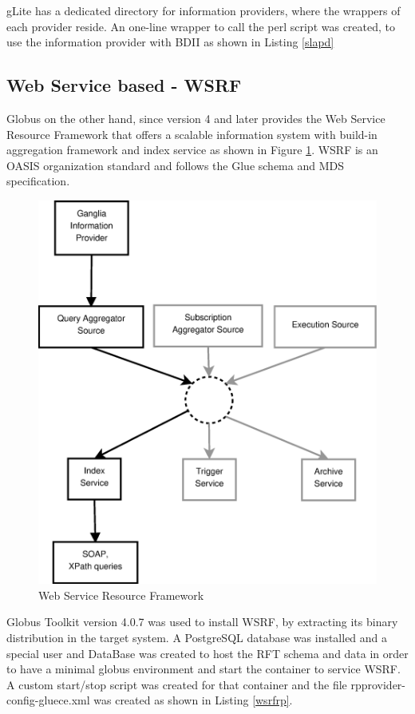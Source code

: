 gLite has a dedicated directory for information providers, where the wrappers of each provider reside. An one-line wrapper to call the perl script was created, to use the information provider with \ac{BDII} as shown in Listing \ref{slapd}

\subsection{Web Service based - WSRF}

Globus on the other hand, since version 4 and later provides the Web Service Resource Framework that offers a scalable information system with build-in aggregation framework and index service as shown in Figure \ref{figure:wsrf}. \ac{WSRF} is an \ac{OASIS} organization standard and follows the Glue schema and MDS specification.

\begin{figure}[htb]
\centering
 \includegraphics[width=120mm]{images/wsrf.eps}
\caption{Web Service Resource Framework}
\label{figure:wsrf}
\end{figure}

Globus Toolkit version 4.0.7 was used to install \ac{WSRF}, by extracting its binary distribution in the target system. A PostgreSQL database was installed and a special user and DataBase was created to host the \ac{RFT} schema and data in order to have a minimal globus environment and start the container to service \ac{WSRF}. A custom start/stop script was created for that container and the file rpprovider-config-gluece.xml was created as shown in Listing \ref{wsrfrp}.

